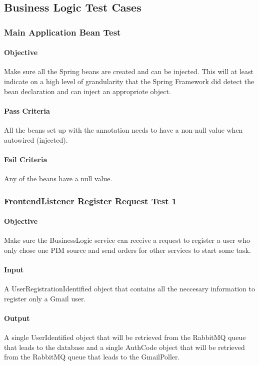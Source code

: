 \documentclass[hidelinks,english]{article}
\begin{document}
		\subsection{Business Logic Test Cases}
			\subsubsection{Main Application Bean Test}\label{businessapplicationbeanstest}
				\paragraph{Objective} Make sure all the Spring beans are created and can be injected. This will at least indicate on a high level of grandularity that the Spring Framework did detect the bean declaration and can inject an appropriote object.
				\paragraph{Pass Criteria} All the beans set up with the \emph{\@Bean} annotation needs to have a non-null value when autowired (injected).
				\paragraph{Fail Criteria} Any of the beans have a null value.
		
			\subsubsection{FrontendListener Register Request Test 1}\label{businessfrontendlistenerregistertest1}
				\paragraph{Objective} Make sure the BusinessLogic service can receive a request to register a user who only chose one PIM source and send orders for other services to start some task.
				\paragraph{Input} A UserRegistrationIdentified object that contains all the neccesary information to register only a Gmail user.
				\paragraph{Output} A single UserIdentified object that will be retrieved from the RabbitMQ queue that leads to the database and a single AuthCode object that will be retrieved from the RabbitMQ queue that leads to the GmailPoller.
\end{document}
